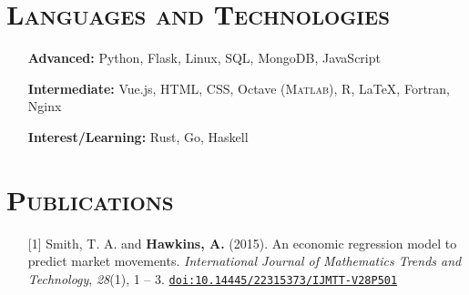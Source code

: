 \documentclass[10pt]{article}
\begin{document}
\section*{\textsc{Languages and Technologies}}
\begin{itemize}
    \item[] \textbf{Advanced:} Python, Flask, Linux, SQL, MongoDB, JavaScript
    \item[] \textbf{Intermediate:} Vue.js, HTML, CSS, Octave (\textsc{Matlab}), \textsc{R}, \LaTeX{}, Fortran, Nginx
    \item[] \textbf{Interest/Learning:} Rust, Go, Haskell
\end{itemize}

\section*{\textsc{Publications}}
\begin{itemize}[leftmargin=*]
    \item[] [1] Smith, T. A. and \textbf{Hawkins, A.} (2015). An economic regression model to predict market movements. \textit{International Journal of Mathematics Trends and Technology}, \textit{28}(1), 1 -- 3. \texttt{\href{http://dx.doi.org/10.14445/22315373/IJMTT-V28P501}{doi:10.14445/22315373/IJMTT-V28P501}}
\end{itemize}
\end{document}
